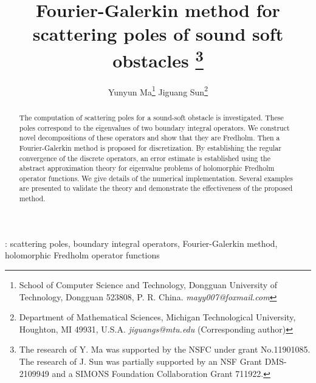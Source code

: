 \documentclass{article}
\begin{document}
	
	\title{Fourier-Galerkin method for scattering poles of sound soft obstacles
		\thanks{The research of Y. Ma was supported  by the NSFC under grant No.11901085. The research of J. Sun was partially supported by an NSF Grant DMS-2109949 and a SIMONS Foundation Collaboration Grant 711922.
	}}
	
	\author{
		Yunyun Ma\thanks{
			School of Computer Science and Technology, Dongguan University of Technology, Dongguan 523808, P. R. China.
			{\it mayy007@foxmail.com}}\quad 
		Jiguang Sun\thanks{Department of Mathematical Sciences, Michigan Technological University, Houghton, MI 49931, U.S.A. {\it jiguangs@mtu.edu} (Corresponding author)}
	}
	
	\maketitle
	
	\begin{abstract}
		The computation of scattering poles for a sound-soft obstacle is investigated. These poles correspond to the eigenvalues of two boundary integral operators. We construct novel decompositions of these operators and show that they are Fredholm. Then a Fourier-Galerkin method is proposed for discretization. By establishing the regular convergence of the discrete operators, an error estimate is established using the abstract approximation theory for eigenvalue problems of holomorphic Fredholm operator functions. We give details of the numerical implementation. Several examples are presented to validate the theory and demonstrate the effectiveness of the proposed method. 
	\end{abstract}
	
	:  scattering poles, boundary integral operators, Fourier-Galerkin method, holomorphic Fredholm operator functions
	
\end{document}
